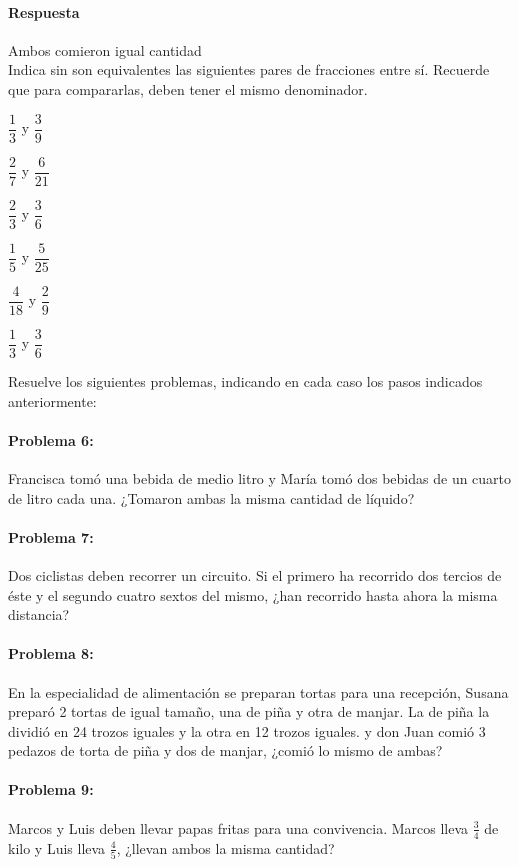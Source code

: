 \documentclass[10pt,twoside]{article}
\begin{document}
\paragraph*{Respuesta}
Ambos comieron igual cantidad\\
Indica sin son equivalentes las siguientes pares de fracciones entre sí. Recuerde que para compararlas, deben tener el mismo denominador.
\begin{itemize}
\begin{multicols}{3}
\item $\dfrac{1}{3}$ y $\dfrac{3}{9}$
\item $\dfrac{2}{7}$ y $\dfrac{6}{21}$
\item $\dfrac{2}{3}$ y $\dfrac{3}{6}$
\item $\dfrac{1}{5}$ y $\dfrac{5}{25}$
\item $\dfrac{4}{18}$ y $\dfrac{2}{9}$
\item $\dfrac{1}{3}$ y $\dfrac{3}{6}$
\end{multicols}
\end{itemize}
Resuelve los siguientes problemas, indicando en cada caso los pasos indicados anteriormente:
\paragraph*{Problema 6:}
Francisca tomó una bebida de medio litro y María tomó dos bebidas de un cuarto de litro cada una. ¿Tomaron ambas la misma cantidad de líquido?
\paragraph*{Problema 7:}
Dos ciclistas deben recorrer un circuito. Si el primero ha recorrido dos tercios de éste y el segundo cuatro sextos del mismo, ¿han recorrido hasta ahora la misma distancia?
\paragraph*{Problema 8:} 
En la especialidad de alimentación se preparan tortas para una recepción, Susana preparó 2 tortas de igual tamaño, una de piña y otra de manjar. La de piña la dividió en 24 trozos
iguales y la otra en 12 trozos iguales. y don Juan comió 3 pedazos de torta de piña y dos de manjar, ¿comió lo mismo de ambas?
\paragraph*{Problema 9:}
Marcos y Luis deben llevar papas fritas para una convivencia. Marcos lleva $\frac{3}{4}$ de kilo y Luis lleva $\frac{4}{5}$, ¿llevan ambos la misma cantidad?
\end{document}
